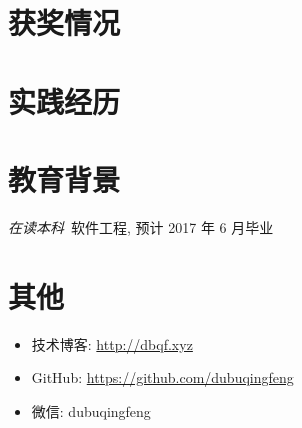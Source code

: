 \documentclass{resume}
\begin{document}
\section{获奖情况}

\section{实践经历}

\section{教育背景}
\textit{在读本科}\ 软件工程, 预计 2017 年 6 月毕业

\section{其他}
\begin{itemize}[parsep=0.5ex]
  \item 技术博客: \href{http://dbqf.xyz}{http://dbqf.xyz}
  \item GitHub: \href{https://github.com/dubuqingfeng}{https://github.com/dubuqingfeng}
  \item 微信: dubuqingfeng
\end{itemize}
\end{document}
